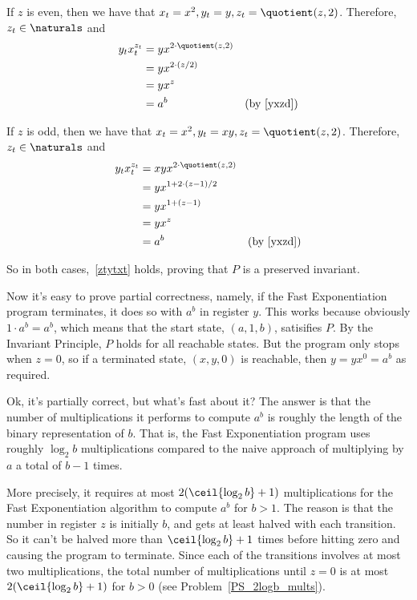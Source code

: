 If $z$ is even, then we have that $x_t = x^2, y_t = y, z_t =
\quotient(z,2)$.  Therefore, $z_t \in \naturals$ and
\begin{align*}
y_tx_t^{z_t} &  = yx^{2 \cdot \quotient(z,2)}\\
           & = yx^{2 \cdot (z/2)}\\
           & = yx^z\\
          & = a^b & \mbox{(by~\eqref{yxzd})}
\end{align*}

If $z$ is odd, then we have that $x_t = x^2, y_t = xy, z_t =
\quotient(z,2)$. Therefore, $z_t \in \naturals$ and
\begin{align*}
y_tx_t^{z_t} & = xyx^{2 \cdot \quotient(z,2)}\\
& = yx^{1+2 \cdot (z-1)/2}\\
& = yx^{1+(z-1)}\\
& = yx^z\\
& = a^b & \mbox{(by~\eqref{yxzd})}
\end{align*}

So in both cases,~\eqref{ztytxt} holds, proving that $P$ is a preserved
invariant.

Now it's easy to prove partial correctness, namely, if the Fast
Exponentiation program terminates, it does so with $a^b$ in register
$y$.  This works because obviously $1\cdot a^b = a^b$, which means
that the start state, $(a,1,b)$, satisifies $P$.  By the Invariant
Principle, $P$ holds for all reachable states.  But the program
only stops when $z = 0$, so if a terminated state, $(x,y,0)$ is
reachable, then $y = yx^0 = a^b$ as required.

Ok, it's partially correct, but what's fast about it?  The answer is
that the number of multiplications it performs to compute $a^b$ is
roughly the length of the binary representation of $b$.  That is, the
Fast Exponentiation program uses roughly $\log_2 b$ multiplications
compared to the naive approach of multiplying by $a$ a total of $b-1$
times.

More precisely, it requires at most $2 (\ceil{\log_2 b}+1)$
multiplications for the Fast Exponentiation algorithm to compute $a^b$ for
$b>1$.  The reason is that the number in register $z$ is initially $b$,
and gets at least halved with each transition.  So it can't be halved more
than $\ceil{\log_2 b}+1$ times before hitting zero and causing the
program to terminate.  \iffalse The $(b+1)$ comes in because for $b =
2^p$, a power of two, it takes $(p+1)$ halves to get zero.  \fi Since each
of the transitions involves at most two multiplications, the total number
of multiplications until $z=0$ is at most $2(\ceil{\log_2 b}+1)$ for $b
> 0$ (see Problem~\ref{PS_2logb_mults}).


